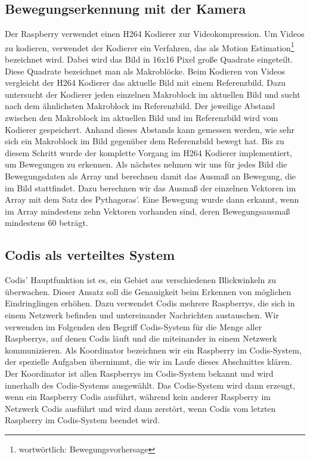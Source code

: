 \documentclass[journal]{IEEEtran}
\begin{document}
\subsection{Bewegungserkennung mit der Kamera}

Der Raspberry verwendet einen H264 Kodierer zur Videokompression. Um Videos zu kodieren, verwendet der Kodierer ein Verfahren, das als Motion Estimation\footnote{wortwörtlich: Bewegungsvorhersage}\cite{estimation} bezeichnet wird. Dabei wird das Bild in 16x16 Pixel große Quadrate eingeteilt. Diese Quadrate bezeichnet man als Makroblöcke. Beim Kodieren von Videos vergleicht der H264 Kodierer das aktuelle Bild mit einem Referenzbild. Dazu untersucht der Kodierer jeden einzelnen Makroblock im aktuellen Bild und sucht nach dem ähnlichsten Makroblock im Referenzbild. Der jeweilige Abstand zwischen den Makroblock im aktuellen Bild und im Referenzbild wird vom Kodierer gespeichert. Anhand dieses Abstands kann gemessen werden, wie sehr sich ein Makroblock im Bild gegenüber dem Referenzbild bewegt hat. Bis zu diesem Schritt wurde der komplette Vorgang im H264 Kodierer implementiert, um Bewegungen zu erkennen.\cite{vektoren} Als nächstes nehmen wir uns für jedes Bild die Bewegungsdaten als Array und berechnen damit das Ausmaß an Bewegung, die im Bild stattfindet. Dazu berechnen wir das Ausmaß der einzelnen Vektoren im Array mit dem Satz des Pythagoras'. Eine Bewegung wurde dann erkannt, wenn im Array mindestens zehn Vektoren vorhanden sind, deren Bewegungsausmaß mindestens 60 beträgt.

\subsection{Codis als verteiltes System}

Codis' Hauptfunktion ist es, ein Gebiet aus verschiedenen Blickwinkeln zu überwachen. Dieser Ansatz soll die Genauigkeit beim Erkennen von möglichen Eindringlingen erhöhen. Dazu verwendet Codis mehrere Raspberrys, die sich in einem Netzwerk befinden und untereinander Nachrichten austauschen. Wir verwenden im Folgenden den Begriff Codis-System für die Menge aller Raspberrys, auf denen Codis läuft und die miteinander in einem Netzwerk kommunizieren. Als Koordinator bezeichnen wir ein Raspberry im Codis-System, der spezielle Aufgaben übernimmt, die wir im Laufe dieses Abschnittes klären. Der Koordinator ist allen Raspberrys im Codis-System bekannt und wird innerhalb des Codis-Systems ausgewählt. Das Codis-System wird dann erzeugt, wenn ein Raspberry Codis ausführt, während kein anderer Raspberry im Netzwerk Codis ausführt und wird dann zerstört, wenn Codis vom letzten Raspberry im Codis-System beendet wird. 
\end{document}
